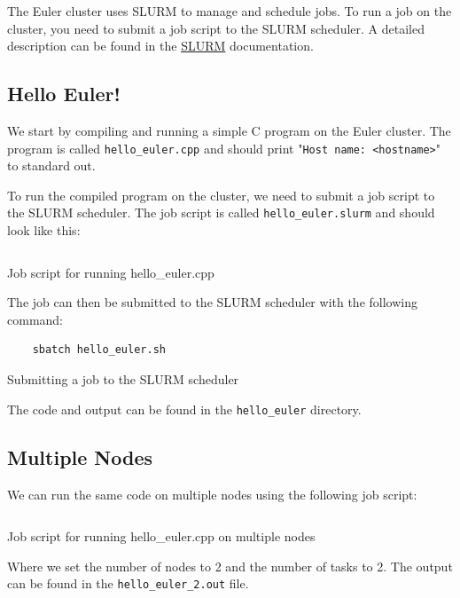 \documentclass[unicode,11pt,a4paper,oneside,numbers=endperiod,openany]{scrartcl}
\begin{document}
The Euler cluster uses SLURM to manage and schedule jobs. To run a job on the cluster, you need to submit a job script to the SLURM scheduler. A detailed description can be found in the \href{https://scicomp.ethz.ch/wiki/Job_management_with_SLURM}{SLURM} documentation.

\subsection{Hello Euler!}

We start by compiling and running a simple C program on the Euler cluster. The program is called \texttt{hello\_euler.cpp} and should print "\texttt{Host name: <hostname>}" to standard out.

To run the compiled program on the cluster, we need to submit a job script to the SLURM scheduler. The job script is called \texttt{hello\_euler.slurm} and should look like this:

\begin{listing}[!ht]
    \inputminted{bash}{../01a/hello_euler/hello_euler_1.sh}
    \caption{Job script for running hello\_euler.cpp}
    \label{lst:hello_euler}
\end{listing}

The job can then be submitted to the SLURM scheduler with the following command:

\begin{listing}[!ht]
    \begin{verbatim}
    sbatch hello_euler.sh
    \end{verbatim}
    \caption{Submitting a job to the SLURM scheduler}
    \label{lst:sbatch}
\end{listing}

The code and output can be found in the \texttt{hello\_euler} directory.

\subsection{Multiple Nodes}

We can run the same code on multiple nodes using the following job script:


\begin{listing}[!ht]
    \inputminted{bash}{../01a/hello_euler/hello_euler_2.sh}
    \caption{Job script for running hello\_euler.cpp on multiple nodes}
    \label{lst:hello_euler_2}
\end{listing}

Where we set the number of nodes to 2 and the number of tasks to 2. The output can be found in the \texttt{hello\_euler\_2.out} file.
\end{document}
